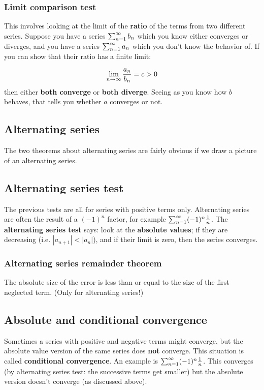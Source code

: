 \subsubsection{Limit comparison test}
This involves looking at the limit of the \textbf{ratio} of the terms from two different series. Suppose you have a series $\sum_{n=1}^{\infty} b_n$ which you know either converges or diverges, and you have a series $\sum_{n=1}^{\infty} a_n$ which you don't know the behavior of. If you can show that their ratio has a finite limit:

$$
\lim\limits_{n \to \infty} \frac{a_n}{b_n} = c > 0
$$
then either \textbf{both converge} or \textbf{both diverge}. Seeing as you know how $b$ behaves, that tells you whether $a$ converges or not.


\subsection{Alternating series}
The two theorems about alternating series are fairly obvious if we draw a picture of an alternating series.

\subsection{Alternating series test}
The previous tests are all for series with positive terms only. Alternating series are often the result of a $(-1)^n$ factor, for example $\sum_{n=1}^{\infty} (-1)^n \frac{1}{n}$. The \textbf{alternating series test} says: look at the \textbf{absolute values}; if they are decreasing (i.e. $|a_{n+1}| < |a_n|$), and if their limit is zero, then the series converges.


\subsubsection{Alternating series remainder theorem}
The absolute size of the error is less than or equal to the size of the first neglected term. (Only for alternating series!)


\subsection{Absolute and conditional convergence}

Sometimes a series with positive and negative terms might converge, but the absolute value version of the same series does \textbf{not} converge. This situation is called \textbf{conditional convergence}. An example is $\sum_{n=1}^{\infty} (-1)^n \frac{1}{n}$. This converges (by alternating series test: the successive terms get smaller) but the absolute version doesn't converge (as discussed above).

